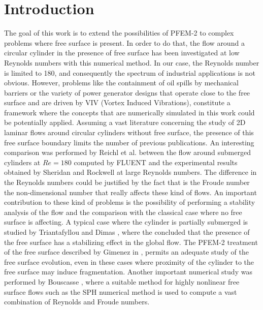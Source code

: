 \documentclass[a4paper,conference]{IEEEtran}
\begin{document}
\section{Introduction}

The goal of this work is to extend the possibilities of PFEM-2 to complex problems where free surface is present. In order to do that, the flow around a circular cylinder in the presence of free surface has been investigated at low Reynolds numbers with this numerical method. In our case, the Reynolds number is limited to 180, and consequently the spectrum of industrial applications is not obvious. However, problems like the containment of oil spills by mechanical barriers \cite{Amini20081479} or the variety of power generator designs that operate close to the free surface and are driven by VIV (Vortex Induced Vibrations), constitute a framework where the concepts that are numerically simulated in this work could be potentially applied. Assuming a vast literature concerning the study of 2D laminar flows around circular cylinders without free surface, the presence of this free surface boundary limits the number of previous publications. An interesting comparison was performed by Reichl et al. \cite{Reichl05} 
between the flow around submerged cylinders at $Re=180$ computed by FLUENT and the experimental results obtained by Sheridan and Rockwell \cite{sheridan_etal_pof1995_metastable_cylinder_fs,SHERIDAN_ROCKWELL_JFM1997} at large Reynolds numbers. The difference in the Reynolds numbers could be justified by the fact that is the Froude number the non-dimensional number that really affects these kind of flows. An important contribution to these kind of problems is the possibility of performing a stability analysis of the flow and the comparison with the classical case where no free surface is affecting. A typical case where the cylinder is partially submerged is studied by Triantafyllou and Dimas \cite{Dimas89}, where the concluded that the presence of the free surface has a stabilizing effect in the global flow. The PFEM-2 treatment of the free surface described by Gimenez in \cite{Gimenez2015186}, permits an adequate study of the free surface evolution, even in these cases where proximity of the cylinder to the 
free surface may induce fragmentation. Another important numerical study was performed by Bouscasse \cite{Bouscasse14}, where a suitable method for highly nonlinear free surface flows such as the SPH numerical method \cite{Mon77} is used to compute a vast combination of Reynolds and Froude numbers.
\end{document}

